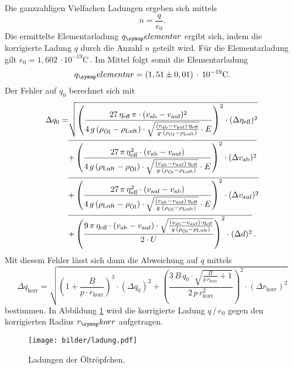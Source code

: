 Die ganzzahligen Vielfachen Ladungen ergeben sich mittels
\begin{equation}
  n = \frac{q}{e_0}.
\end{equation}
Die ermittelte Elementarladung $q_\su{elementar}$ ergibt sich, indem die korrigierte Ladung $q$ durch die Anzahl $n$ geteilt wird. Für die Elementarladung gilt $e_0=1,602\,\cdot 10^{-19}\si{\coulomb}$\,\cite{el}.
Im Mittel folgt somit die Elementarladung
\begin{equation}
  q_\su{elementar} = (1,51\pm0,01)\,\cdot\,10^{-19}\si{\coulomb}.
\end{equation}
Der Fehler auf $q_0$ berechnet sich mit
\begin{align}
 \Delta q_\text{0} = &\sqrt{\left(
\frac{27\,\eta_\text{eff}\,\pi\cdot(v_\text{ab} -
v_\text{auf})^2}{4\,g\,(\rho_\text{Öl} - \rho_\text{Luft}) \cdot \sqrt{
\frac{(v_\text{ab} -
v_\text{auf})\,\eta_\text{eff}}{g\cdot(\rho_\text{Öl} -
\rho_\text{Luft})}} \cdot E} \right)^2 \cdot
(\Delta\eta_\text{eff})^2}\notag \\
 &\overline{+ \left( \frac{27\,\pi\,\eta_\text{eff}^2\cdot(v_\text{ab} -
v_\text{auf})}{4\,g\,(\rho_\text{Luft} - \rho_\text{Öl}) \cdot \sqrt{
\frac{(v_\text{ab} -
v_\text{auf})\,\eta_\text{eff}}{g\cdot(\rho_\text{Öl} -
\rho_\text{Luft})}} \cdot E} \right)^2 \cdot (\Delta
v_\text{ab})^2}\notag \\
 &\overline{+ \left( \frac{27\,\pi\,\eta_\text{eff}^2\cdot(v_\text{auf} -
v_\text{ab})}{4\,g\,(\rho_\text{Luft} - \rho_\text{Öl}) \cdot \sqrt{
\frac{(v_\text{ab} -
v_\text{auf})\,\eta_\text{eff}}{g\cdot(\rho_\text{Öl} -
\rho_\text{Luft})}} \cdot E}  \right)^2 \cdot (\Delta
v_\text{auf})^2}\notag \\
 &\overline{+ \left( \frac{9\,\pi\,\eta_\text{eff}\cdot(v_\text{ab} -
v_\text{auf})\cdot\sqrt{\frac{(v_\text{ab} -
v_\text{auf})\cdot\eta_\text{eff}}{g\,(\rho_\text{Öl} -
\rho_\text{Luft})}}}{2\cdot U}\right)^2 \cdot (\Delta d)^2}\,.
\end{align}
Mit diesem Fehler lässt sich dann die Abweichung auf $q$ mittels
\begin{equation}
 \Delta q_\text{korr} = \sqrt{\left(1 + \frac{B}{p\cdot
r_\text{korr}}\right)^3 \cdot (\Delta q_\text{0})^2 +
\left(\frac{3\,B\,q_\text{0} \cdot \sqrt{\frac{B}{p\,r_\text{korr}} +
1}}{2\,p\,r_\text{korr}^2}\right)^2\cdot (\Delta r_\text{korr})^2}
\end{equation}
bestimmen.
In Abbildung \ref{fig:ladung} wird die korrigierte Ladung $q\,/\,e_0$ gegen
den korrigierten Radius $r_\su{korr}$ aufgetragen.
\begin{figure}[H]
  \centering
  \texttt{[image: bilder/ladung.pdf]}
  \caption{Ladungen der Öltröpfchen.}
  \label{fig:ladung}
\end{figure}
